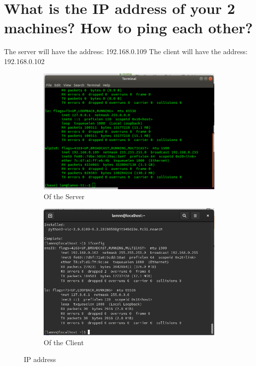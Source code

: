 \documentclass[11pt,a4paper]{article}
\begin{document}
	\section{What is the IP address of your 2 machines? How to ping each other?}
	The server will have the address: 192.168.0.109
	The client will have the address: 192.168.0.102
	\begin{figure}[h!]
		\centering
  		\begin{subfigure}[b]{0.4\linewidth}
  		\includegraphics[width=\linewidth]{ip-server.png}
    		\caption{Of the Server}
  		\end{subfigure}
  		\begin{subfigure}[b]{0.4\linewidth}
    		\includegraphics[width=\linewidth]{ip-client.png}
    		\caption{Of the Client}
  		\end{subfigure}
  		\caption{IP address}
  		\label{fig:addr}
	\end{figure}
\end{document}
